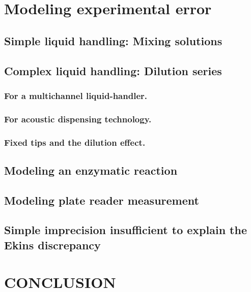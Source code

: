 \documentclass[aps,pre,twocolumn,nofootinbib,superscriptaddress,linenumbers]{revtex4-1}
\begin{document}
\section*{Modeling experimental error}


\subsection*{Simple liquid handling: Mixing solutions}

\subsection*{Complex liquid handling: Dilution series}

\subsubsection*{For a multichannel liquid-handler.}

\subsubsection*{For acoustic dispensing technology.}

\subsubsection*{Fixed tips and the dilution effect.}

\subsection*{Modeling an enzymatic reaction}

\subsection*{Modeling plate reader measurement}

\subsection*{Simple imprecision insufficient to explain the Ekins discrepancy}


\section{CONCLUSION}
\end{document}
